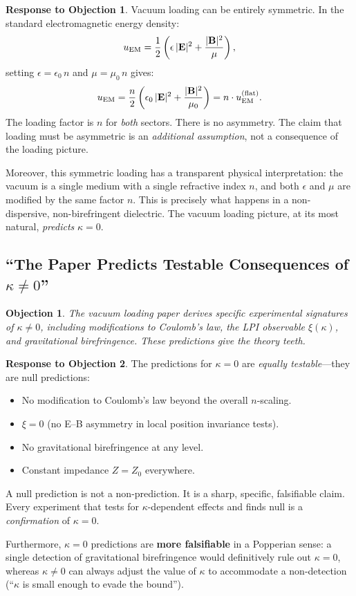 \documentclass[12pt,a4paper]{article}
\newtheorem{objection}{Objection}
\theoremstyle{definition}
\newtheorem{response}{Response to Objection}
\theoremstyle{remark}
\newcommand{\vE}{\mathbf{E}}
\newcommand{\vB}{\mathbf{B}}
\begin{document}
\begin{response}
Vacuum loading can be entirely symmetric.  In the standard
electromagnetic energy density:
\begin{equation}
u_{\rm EM} = \frac{1}{2}\left(\epsilon\, |\vE|^2 + \frac{|\vB|^2}{\mu}\right),
\end{equation}
setting $\epsilon = \epsilon_0\, n$ and $\mu = \mu_0\, n$ gives:
\begin{equation}
u_{\rm EM} = \frac{n}{2}\left(\epsilon_0\, |\vE|^2
  + \frac{|\vB|^2}{\mu_0}\right)
  = n \cdot u_{\rm EM}^{(\rm flat)}.
\end{equation}
The loading factor is $n$ for \emph{both} sectors.  There is no
asymmetry.  The claim that loading must be asymmetric is an \emph{additional
assumption}, not a consequence of the loading picture.

Moreover, this symmetric loading has a transparent physical interpretation:
the vacuum is a single medium with a single refractive index $n$, and
both $\epsilon$ and $\mu$ are modified by the same factor $n$.  This is
precisely what happens in a non-dispersive, non-birefringent dielectric.
The vacuum loading picture, at its most natural, \emph{predicts}
$\kappa = 0$.
\end{response}

\subsection{``The Paper Predicts Testable Consequences of $\kappa \neq 0$''}

\begin{objection}
The vacuum loading paper derives specific experimental signatures of
$\kappa \neq 0$, including modifications to Coulomb's law, the LPI
observable $\xi(\kappa)$, and gravitational birefringence.  These
predictions give the theory teeth.
\end{objection}

\begin{response}
The predictions for $\kappa = 0$ are \emph{equally testable}---they
are null predictions:
\begin{itemize}
\item No modification to Coulomb's law beyond the overall $n$-scaling.
\item $\xi = 0$ (no E--B asymmetry in local position invariance tests).
\item No gravitational birefringence at any level.
\item Constant impedance $Z = Z_0$ everywhere.
\end{itemize}
A null prediction is not a non-prediction.  It is a sharp, specific,
falsifiable claim.  Every experiment that tests for $\kappa$-dependent
effects and finds null is a \emph{confirmation} of $\kappa = 0$.

Furthermore, $\kappa = 0$ predictions are \textbf{more falsifiable}
in a Popperian sense: a single detection of gravitational birefringence
would definitively rule out $\kappa = 0$, whereas $\kappa \neq 0$
can always adjust the value of $\kappa$ to accommodate a non-detection
(``$\kappa$ is small enough to evade the bound'').
\end{response}
\end{document}
